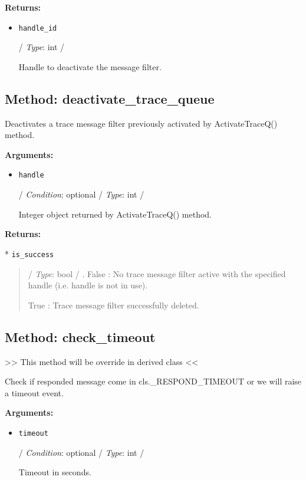 \textbf{Returns:}

\begin{itemize}
\item
  \texttt{handle\_id}

  / \emph{Type}: int /

  Handle to deactivate the message filter.
\end{itemize}

\hypertarget{qconnectbase-connection-base-method-deactivate_trace_queue-17}{%
\subsection{Method:
deactivate\_trace\_queue}\label{qconnectbase-connection-base-method-deactivate_trace_queue-17}}

Deactivates a trace message filter previously activated by
ActivateTraceQ() method.

\textbf{Arguments:}

\begin{itemize}
\item
  \texttt{handle}

  / \emph{Condition}: optional / \emph{Type}: int /

  Integer object returned by ActivateTraceQ() method.
\end{itemize}

\textbf{Returns:}

* \texttt{is\_success}

\begin{quote}
/ \emph{Type}: bool / . False : No trace message filter active with the
specified handle (i.e. handle is not in use).

True : Trace message filter successfully deleted.
\end{quote}

\hypertarget{qconnectbase-connection-base-method-check_timeout-18}{%
\subsection{Method: check\_timeout}\label{qconnectbase-connection-base-method-check_timeout-18}}

\textgreater\textgreater{} This method will be override in derived class
\textless\textless{}

Check if responded message come in cls.\_RESPOND\_TIMEOUT or we will
raise a timeout event.

\textbf{Arguments:}

\begin{itemize}
\item
  \texttt{timeout}

  / \emph{Condition}: optional / \emph{Type}: int /

  Timeout in seconds.
\end{itemize}


